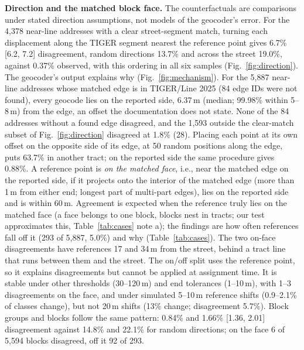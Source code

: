 \documentclass[runningheads]{llncs}
\begin{document}
\textbf{Direction and the matched block face.} The counterfactuals are comparisons under stated direction assumptions, not models of the geocoder's error. For the 4{,}378 near-line addresses with a clear street-segment match, turning each displacement along the TIGER segment nearest the reference point gives 6.7\% [6.2, 7.2] disagreement, random directions 13.7\% and across the street 19.0\%, against 0.37\% observed, with this ordering in all six samples (Fig.~\ref{fig:direction}). The geocoder's output explains why (Fig.~\ref{fig:mechanism}). For the 5{,}887 near-line addresses whose matched edge is in TIGER/Line 2025 (84 edge IDs were not found), every geocode lies on the reported side, 6.37\,m (median; 99.98\% within 5--8\,m) from the edge, an offset the documentation does not state. None of the 84 addresses without a found edge disagreed, and the 1{,}593 outside the clear-match subset of Fig.~\ref{fig:direction} disagreed at 1.8\% (28). Placing each point at its own offset on the opposite side of its edge, at 50 random positions along the edge, puts 63.7\% in another tract; on the reported side the same procedure gives 0.88\%. A reference point is \emph{on the matched face}, i.e., near the matched edge on the reported side, if it projects onto the interior of the matched edge (more than 1\,m from either end; longest part of multi-part edges), lies on the reported side and is within 60\,m. Agreement is expected when the reference truly lies on the matched face (a face belongs to one block, blocks nest in tracts; our test approximates this, Table~\ref{tab:cases} note a); the findings are how often references fall off it (293 of 5{,}887, 5.0\%) and why (Table~\ref{tab:cases}). The two on-face disagreements have references 17 and 34\,m from the street, behind a tract line that runs between them and the street. The on/off split uses the reference point, so it explains disagreements but cannot be applied at assignment time. It is stable under other thresholds (30--120\,m) and end tolerances (1--10\,m), with 1--3 disagreements on the face, and under simulated 5--10\,m reference shifts (0.9--2.1\% of classes change), but not 20\,m shifts (13\% change; disagreement 5.7\%). Block groups and blocks follow the same pattern: 0.84\% and 1.66\% [1.36, 2.01] disagreement against 14.8\% and 22.1\% for random directions; on the face 6 of 5{,}594 blocks disagreed, off it 92 of 293.
\end{document}
